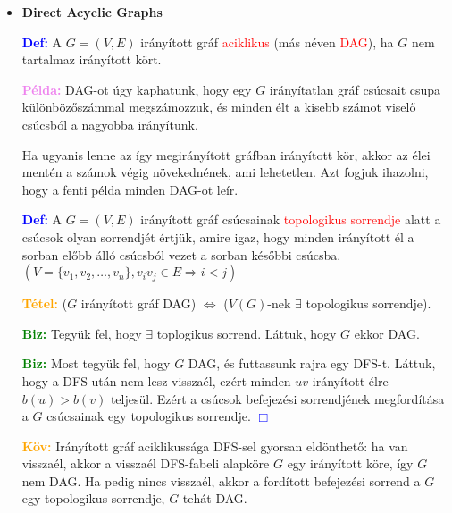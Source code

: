 \documentclass[../../szobeli.tex]{subfiles}
\begin{document}
\begin{center}
    \noindent{}
\end{center}

    \begin{itemize}
        \item \textbf{Direct Acyclic Graphs}

        \textcolor{blue}{\textbf{Def:}} A $G = (V,E)$ irányított gráf \textcolor{red}{aciklikus} (más néven \textcolor{red}{DAG}), ha $G$ nem tartalmaz irányított kört.

        \textcolor{violet}{\textbf{Példa:}} DAG-ot úgy kaphatunk, hogy egy $G$ irányítatlan gráf csúcsait csupa különbözőszámmal megszámozzuk, és minden élt a kisebb számot viselő csúcsból a nagyobba irányítunk.

        Ha ugyanis lenne az így megirányított gráfban irányított kör, akkor az élei mentén a számok végig növekednének, ami lehetetlen. Azt fogjuk ihazolni, hogy a fenti példa minden DAG-ot leír.

        \textcolor{blue}{\textbf{Def:}} A $G = (V,E)$ irányított gráf csúcsainak \textcolor{red}{topologikus sorrendje} alatt a csúcsok olyan sorrendjét értjük, amire igaz, hogy minden irányított él a sorban előbb álló csúcsból vezet a sorban későbbi csúcsba. $(V=\{v_1,v_2,\dots,v_n\},v_iv_j \in E \Rightarrow i < j)$

        \textcolor{orange}{\textbf{Tétel:}} ($G$ irányított gráf DAG) $\Leftrightarrow$ ($V(G)$-nek $\exists$ topologikus sorrendje).

        \textcolor{green}{\textbf{Biz:}} Tegyük fel, hogy $\exists$ toplogikus sorrend. Láttuk, hogy $G$ ekkor DAG. \checkmark

        \textcolor{green}{\textbf{Biz:}} Most tegyük fel, hogy $G$ DAG, és futtassunk rajra egy DFS-t. Láttuk, hogy a DFS után nem lesz visszaél, ezért minden $uv$ irányított élre $b(u) > b(v)$ teljesül. Ezért a csúcsok befejezési sorrendjének megfordítása a $G$ csúcsainak egy topologikus sorrendje.  \textcolor{blue}{$\Box$} 

        \textcolor{orange}{\textbf{Köv:}} Irányított gráf aciklikussága DFS-sel gyorsan eldönthető: ha van visszaél, akkor a visszaél DFS-fabeli alapköre $G$ egy irányított köre, így $G$ nem DAG. Ha pedig nincs visszaél, akkor a fordított befejezési sorrend a $G$ egy topologikus sorrendje, $G$ tehát DAG.


\end{itemize}
\end{document}
